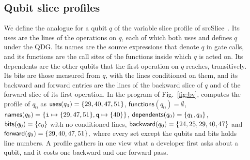 \subsection{Qubit slice profiles}\label{sec:profiles}
We define the analogue for a qubit $q$ of the variable slice profile of srcSlice~\cite{alomari2014srcslice}. Its uses are the lines of the operations on $q$, each of which both uses and
defines $q$ under the QDG. Its names are the source expressions that denote $q$ in gate calls, and its
functions are the call sites of the functions inside which $q$ is acted on. Its dependents are the other
qubits that the first operation on $q$ reaches, transitively.
Its bits are those measured from $q$, with the lines conditioned on them, and its backward and forward
entries are the lines of the backward slice of $q$ and of the forward slice of its first operation. In
the program of Fig.~\ref{fig:bv}, \tool{} computes the profile of
$q_0$ as $\mathsf{uses}(q_0) = \{29, 40, 47, 51\}{}$, $\mathsf{functions}(q_0) = \emptyset$,
$\mathsf{names}(q_0) = \{{\texttt{i} \mapsto \{29, 47, 51\}{}}, {\texttt{q} \mapsto \{40\}{}}\}$,
$\mathsf{dependents}(q_0) = \{q_1, q_3\}{}$, $\mathsf{bits}(q_0) = \{c_0\}{}$ with no
conditioned lines, $\mathsf{backward}(q_0) = \{24, 25, 29, 40, 47\}{}$ and $\mathsf{forward}(q_0) =
\{29, 40, 47, 51\}{}$, where every set except the qubits and bits holds line numbers. A profile gathers
in one view what a developer first asks about a qubit, and it costs one backward and one forward pass.
